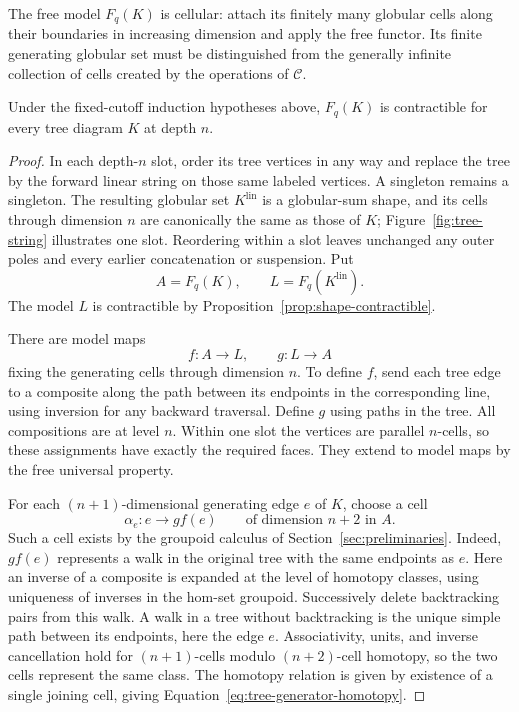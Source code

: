 The free model $F_q(K)$ is cellular: attach its finitely many
globular cells along their boundaries in increasing dimension and
apply the free functor.  Its finite generating globular set must
be distinguished from the generally infinite collection of cells
created by the operations of $\mathcal C$.



\begin{proposition}
\label{prop:tree-contractible}
Under the fixed-cutoff induction hypotheses above, $F_q(K)$ is
contractible for every tree diagram $K$ at depth $n$.
\end{proposition}

\begin{proof}
In each depth-$n$ slot, order its tree vertices in any way and
replace the tree by the forward linear string on those same
labeled vertices.  A singleton remains a singleton.  The resulting
globular set $K^{\mathrm{lin}}$ is a globular-sum shape, and its
cells through dimension $n$ are canonically the same as those of
$K$; Figure~\ref{fig:tree-string} illustrates one slot.  Reordering
within a slot leaves unchanged any outer poles and
every earlier concatenation or suspension.  Put
\[
 A=F_q(K),\qquad L=F_q(K^{\mathrm{lin}}).
\]
The model $L$ is contractible by
Proposition~\ref{prop:shape-contractible}.

There are model maps
\[
 f:A\longrightarrow L,\qquad g:L\longrightarrow A
\]
fixing the generating cells through dimension $n$.  To define
$f$, send each tree edge to a composite along the path between
its endpoints in the corresponding line, using inversion for
any backward traversal.  Define $g$ using paths in the tree.
All compositions are at level $n$.  Within one slot the vertices
are parallel $n$-cells, so these assignments have exactly the
required faces.  They extend to model maps by the free universal
property.

For each $(n+1)$-dimensional generating edge $e$ of $K$, choose
a cell
\begin{equation}\label{eq:tree-generator-homotopy}
 \alpha_e:e\longrightarrow gf(e)
 \qquad\text{of dimension }n+2\text{ in }A.
\end{equation}
Such a cell exists by the groupoid calculus of
Section~\ref{sec:preliminaries}.  Indeed, $gf(e)$ represents a
walk in the original tree with the same endpoints as $e$.
Here an inverse of a composite is expanded at the level of homotopy
classes, using uniqueness of inverses in the hom-set groupoid.
Successively delete backtracking pairs from this walk.  A walk
in a tree without backtracking is the unique simple path between
its endpoints, here the edge $e$.  Associativity, units, and
inverse cancellation hold for $(n+1)$-cells modulo
$(n+2)$-cell homotopy, so the two cells represent the same class.
The homotopy relation is given by existence of a single joining
cell, giving Equation~\eqref{eq:tree-generator-homotopy}.


\end{proof}
